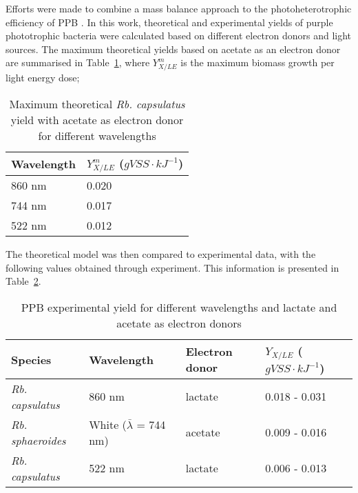Efforts were made to combine a mass balance approach to the photoheterotrophic efficiency of PPB \cite{minkevich2004}. In this work, theoretical and experimental yields of purple phototrophic bacteria were calculated based on different electron donors and light sources. The maximum theoretical yields based on acetate as an electron donor are summarised in Table~\ref{tab:theoreticalQuantum}, where $Y^m_{X/LE}$ is the maximum biomass growth per light energy dose;

\begin{table}[H]
  \begin{center}
    \caption{Maximum theoretical \textit{Rb. capsulatus} yield with
      acetate as electron donor for different wavelengths
      \cite{minkevich2004}}
    \label{tab:theoreticalQuantum}
    \begin{tabular}{ | l | l |}
      \hline
      Wavelength& $Y^m_{X/LE}$ ($gVSS\cdot kJ^{-1}$)\\ \hline \hline
      860 nm & 0.020 \\ \hline
      744 nm & 0.017  \\ \hline
      522 nm & 0.012  \\ \hline
    \end{tabular}
  \end{center}
\end{table}

The theoretical model was then compared to experimental data, with the
following values obtained through experiment. This information is
presented in Table~\ref{tab:expQuantum}.

\begin{table}[H]
  \begin{center}
    \caption{PPB experimental yield for different wavelengths and
      lactate and acetate as electron donors\cite{minkevich2004}}
    \label{tab:expQuantum}
    \begin{tabular}{ | l | l | l | l |}
      \hline
      \textbf{Species} & \textbf{Wavelength} & \textbf{Electron donor} & $Y_{X/LE}$ ($gVSS\cdot kJ^{-1}$)\\ \hline \hline
      \textit{Rb. capsulatus} & 860 nm & lactate & 0.018 - 0.031 \\ \hline
      \textit{Rb. sphaeroides} & White ($\bar{\lambda}$ = 744 nm) & acetate & 0.009 - 0.016 \\ \hline
      \textit{Rb. capsulatus} & 522 nm & lactate & 0.006 - 0.013 \\ \hline

    \end{tabular}
  \end{center}
\end{table}
	
